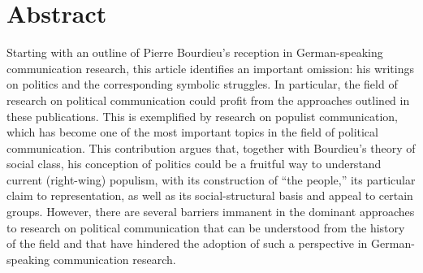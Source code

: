 \documentclass{tufte-handout}
\begin{document}
\begin{titlepage}
\begin{fullwidth}
\end{fullwidth}

\vspace*{1em}


\hypertarget{abstract}{%
\section{Abstract}\label{abstract}}

Starting with an outline of Pierre Bourdieu's reception in
German-speaking communication research, this article identifies an
important omission: his writings on politics and the corresponding
symbolic struggles. In particular, the field of research on political
communication could profit from the approaches outlined in these
publications. This is exemplified by research on populist communication,
which has become one of the most important topics in the field of
political communication. This contribution argues that, together with
Bourdieu's theory of social class, his conception of politics could be a
fruitful way to understand current (right-wing) populism, with its
construction of ``the people,'' its particular claim to representation,
as well as its social-structural basis and appeal to certain groups.
However, there are several barriers immanent in the dominant approaches
to research on political communication that can be understood from the
history of the field and that have hindered the adoption of such a
perspective in German-speaking communication research.




\vspace*{2em}



 \end{titlepage}

\end{document}
